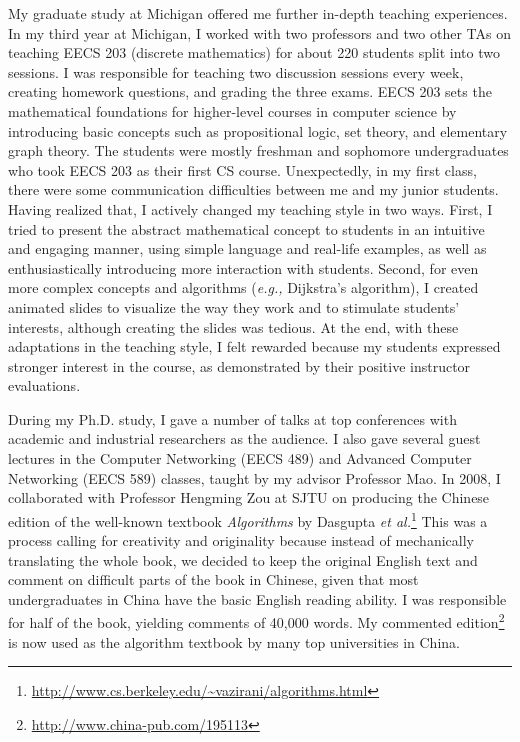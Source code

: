\documentclass[10pt]{article}
\newcommand{\eg}{\emph{e.g.,}\xspace}
\newcommand{\etal}{\emph{et al.}\xspace}
\begin{document}
\begin{small}

My graduate study at Michigan offered me further in-depth teaching experiences. In my third year at Michigan, I worked with two professors and two other TAs on teaching EECS 203 (discrete mathematics) for about 220 students split into two sessions. I was responsible for teaching two discussion sessions every week, creating homework questions, and grading the three exams. EECS 203 sets the mathematical foundations for higher-level courses in computer science by introducing basic concepts such as propositional logic, set theory, and elementary graph theory. The students were mostly freshman and sophomore undergraduates who took EECS 203 as their first CS course. Unexpectedly, in my first class, there were some communication difficulties between me and my junior students. Having realized that, I actively changed my teaching style in two ways. First, I tried to present the abstract mathematical concept to students in an intuitive and engaging manner, using simple language and real-life examples, as well as enthusiastically introducing more interaction with students. Second, for even more complex concepts and algorithms (\eg Dijkstra's algorithm), I created animated slides to visualize the way they work and to stimulate students' interests, although creating the slides was tedious. At the end, with these adaptations in the teaching style, I felt rewarded because my students expressed stronger interest in the course, as demonstrated by their positive instructor evaluations.

During my Ph.D. study, I gave a number of talks at top conferences with academic and industrial researchers as the audience. I also gave several guest lectures in the Computer Networking (EECS 489) and Advanced Computer Networking (EECS 589) classes, taught by my advisor Professor Mao. In 2008, I collaborated with Professor Hengming Zou at SJTU on producing the Chinese edition of the well-known textbook \emph{Algorithms} by Dasgupta \etal\footnote{\url{http://www.cs.berkeley.edu/~vazirani/algorithms.html}} This was a process calling for creativity and originality because instead of mechanically translating the whole book, we decided to keep the original English text and comment on difficult parts of the book in Chinese, given that most undergraduates in China have the basic English reading ability. I was responsible for half of the book, yielding comments of 40,000 words. My commented edition\footnote{\url{http://www.china-pub.com/195113}} is now used as the algorithm textbook by many top universities in China.


\end{small}
\end{document}
